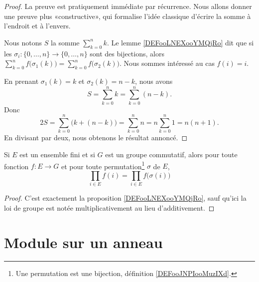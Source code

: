 \begin{proof}
    La preuve est pratiquement immédiate par récurrence. Nous allons donner une preuve plus «constructive», qui formalise l'idée classique d'écrire la somme à l'endroit et à l'envers.


    Nous notons \( S\) la somme \( \sum_{k=0}^nk\). Le lemme \ref{DEFooLNEXooYMQjRo} dit que si les \( \sigma_i\colon \{ 0,\ldots, n \}\to \{ 0,\ldots, n \}\) sont des bijections, alors \( \sum_{k=0}^nf\big( \sigma_1(k) \big)=\sum_{k=0}^nf\big( \sigma_2(k) \big)\). Nous sommes intéressé au cas \( f(i)=i\).

    En prenant \( \sigma_1(k)=k\) et \( \sigma_2(k)=n-k\), nous avons
    \begin{equation}
        S=\sum_{k=0}^nk=\sum_{k=0}^n(n-k).
    \end{equation}
    Donc
    \begin{equation}
        2S=\sum_{k=0}^n\big( k+(n-k) \big)=\sum_{k=0}^nn=n\sum_{k=0}^n1=n(n+1).
    \end{equation}
    En divisant par deux, nous obtenons le résultat annoncé.
\end{proof}

\begin{proposition}     \label{PROPooQMUDooQQVRIe}
    Si \( E\) est un ensemble fini et si \( G\) est un groupe commutatif, alors pour toute fonction \( f\colon E\to G\) et pour toute permutation\footnote{Une permutation est une bijection, définition \ref{DEFooJNPIooMuzIXd}.} \( \sigma\) de \( E\),
    \begin{equation}
        \prod_{i\in E}f(i)=\prod_{i\in E}f\big( \sigma(i) \big)
    \end{equation}
\end{proposition}

\begin{proof}
    C'est exactement la proposition \ref{DEFooLNEXooYMQjRo}, sauf qu'ici la loi de groupe est notée multiplicativement au lieu d'additivement.
\end{proof}

\section{Module sur un anneau}

